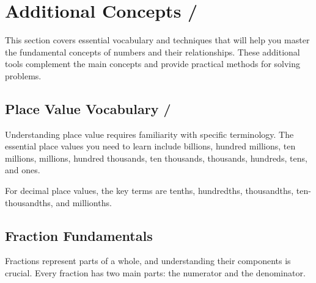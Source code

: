 \cleardoublepage

\section{Additional Concepts / }

This section covers essential vocabulary and techniques that will help you master the fundamental concepts of numbers and their relationships. These additional tools complement the main concepts and provide practical methods for solving problems.

\subsection{Place Value Vocabulary / }

Understanding place value requires familiarity with specific terminology. The essential place values you need to learn include billions, hundred millions, ten millions, millions, hundred thousands, ten thousands, thousands, hundreds, tens, and ones.

\blockquote{}

\blockquote{}

For decimal place values, the key terms are tenths, hundredths, thousandths, ten-thousandths, and millionths.

\blockquote{}

\blockquote{}

\subsection{Fraction Fundamentals}

Fractions represent parts of a whole, and understanding their components is crucial. Every fraction has two main parts: the numerator and the denominator.

\blockquote{}

\blockquote{}

